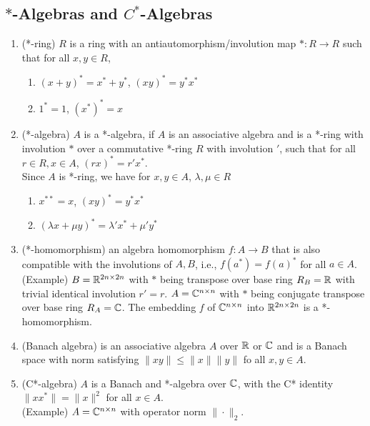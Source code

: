 \subsection{\texorpdfstring{$*$-Algebras and $C^*$-Algebras}{*-Algebras and C*-Algebras}}
\begin{enumerate}
    \item (*-ring) $R$ is a ring with an antiautomorphism/involution map $*: R \to R$ such that for all $x,y\in R$,
        \begin{enumerate}
            \item $(x+y)^*=x^*+y^*$, $(xy)^*=y^* x^*$
            \item $1^*=1$, $(x^*)^*=x$
        \end{enumerate}
    \item (*-algebra) $A$ is a *-algebra, if $A$ is an associative algebra and is a *-ring with involution $*$ over a commutative *-ring $R$ with involution $'$, such that for all $r\in R,x\in A$, $(rx)^*=r' x^*$. \\
    Since $A$ is *-ring, we have for $x,y\in A$, $\lambda,\mu\in R$
        \begin{enumerate}
            \item $x^{**}=x$, $(xy)^*=y^* x^*$
            \item $(\lambda x+\mu y)^*=\lambda' x^* + \mu' y^*$
        \end{enumerate}
    \item (*-homomorphism) an algebra homomorphism $f:A\to B$ that is also compatible with the involutions of $A, B$, i.e., $f(a^*)=f(a)^*$ for all $a\in A$. \\
    (Example) $B=\mathbb{R}^{2n\times 2n}$ with $*$ being transpose over base ring $R_B=\mathbb{R}$ with trivial identical involution $r'=r$. $A=\mathbb{C}^{n\times n}$ with $*$ being conjugate transpose over base ring $R_A=\mathbb{C}$. The embedding $f$ of $\mathbb{C}^{n\times n}$ into $\mathbb{R}^{2n\times 2n}$ is a *-homomorphism. 
    \item (Banach algebra) is an associative algebra $A$ over $\mathbb{R}$ or $\mathbb{C}$ and is a Banach space with norm satisfying $\|xy\| \le \|x\| \|y\| $ fo all $x,y\in A$.
    \item (C*-algebra) $A$ is a Banach and *-algebra over $\mathbb{C}$, with the C* identity $\|xx^*\|=\|x\|^2$ for all $x\in A$. \\
    (Example) $A=\mathbb{C}^{n\times n}$ with operator norm $\|\cdot\|_2$.
\end{enumerate}
